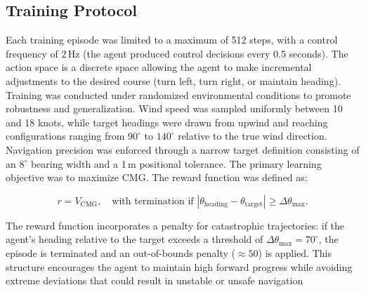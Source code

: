 \subsection{Training Protocol}
Each training episode was limited to a maximum of 512 steps, with a control frequency of $2\,\text{Hz}$ (the agent produced control decisions every 0.5 seconds). The action space is a discrete space allowing the agent to make incremental adjustments to the desired course (turn left, turn right, or maintain heading). Training was conducted under randomized environmental conditions to promote robustness and generalization. Wind speed was sampled uniformly between 10 and 18 knots, while target headings were drawn from upwind and reaching configurations ranging from $90^\circ$ to $140^\circ$ relative to the true wind direction. Navigation precision was enforced through a narrow target definition consisting of an $8^\circ$ bearing width and a 1\,m positional tolerance. The primary learning objective was to maximize CMG. The reward function was defined as:

\[
r = V_{\text{CMG}}, \quad \text{with termination if } |\theta_\text{heading} - \theta_\text{target}| \ge \Delta\theta_{\max}.
\]

\justify The reward function incorporates a penalty for catastrophic trajectories: if the agent's heading relative to the target exceeds a threshold of $\Delta\theta_{\max}=70^\circ$, the episode is terminated and an out-of-bounds penalty ($\approx 50$) is applied. This structure encourages the agent to maintain high forward progress while avoiding extreme deviations that could result in unstable or unsafe navigation

%

